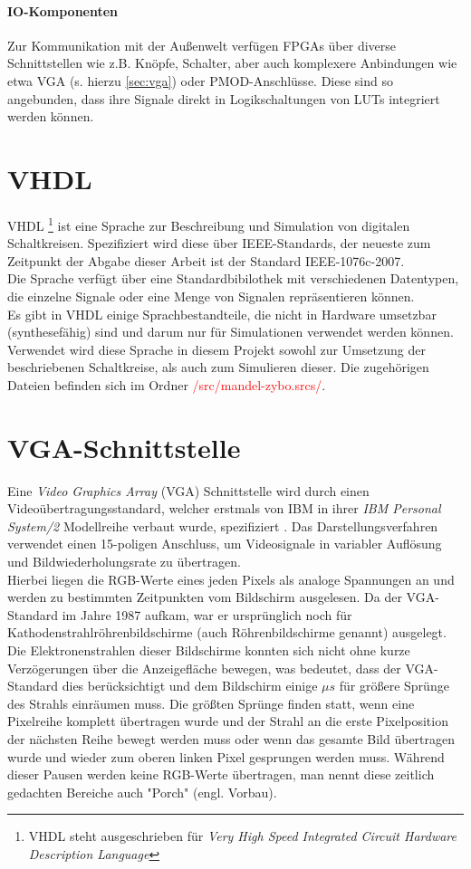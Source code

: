 \documentclass[a4paper,12pt,onesided]{report}
\begin{document}
\paragraph{IO-Komponenten}
Zur Kommunikation mit der Außenwelt verfügen FPGAs über diverse Schnittstellen wie z.B. Knöpfe, Schalter, aber auch komplexere Anbindungen wie etwa VGA (s. hierzu \autoref{sec:vga}) oder PMOD-Anschlüsse.
Diese sind so angebunden, dass ihre Signale direkt in Logikschaltungen von LUTs integriert werden können.

\section{VHDL}
\label{sec:vhdl}
VHDL \footnote{VHDL steht ausgeschrieben für \textit{Very High Speed Integrated Circuit Hardware Description Language}} ist eine Sprache zur Beschreibung und Simulation von digitalen Schaltkreisen.
Spezifiziert wird diese über IEEE-Standards, der neueste zum Zeitpunkt der Abgabe dieser Arbeit ist der Standard IEEE-1076c-2007\cite{ieeevhdl}.\\
Die Sprache verfügt über eine Standardbibilothek mit verschiedenen Datentypen, die einzelne Signale oder eine Menge von Signalen repräsentieren können.\\
Es gibt in VHDL einige Sprachbestandteile, die nicht in Hardware umsetzbar (synthesefähig) sind und darum nur für Simulationen verwendet werden können.
Verwendet wird diese Sprache in diesem Projekt sowohl zur Umsetzung der beschriebenen Schaltkreise, als auch zum Simulieren dieser.
Die zugehörigen Dateien befinden sich im Ordner \textcolor{red}{/src/mandel-zybo.srcs/}.

\section{VGA-Schnittstelle}
\label{sec:vga}
Eine \textit{Video Graphics Array} (VGA) Schnittstelle wird durch einen Videoübertragungsstandard, welcher erstmals von IBM in ihrer \textit{IBM Personal System/2} Modellreihe verbaut wurde, spezifiziert \cite{ibmTimeline}. 
Das Darstellungsverfahren verwendet einen 15-poligen Anschluss, um Videosignale in variabler Auflösung und Bildwiederholungsrate zu übertragen.\\
Hierbei liegen die RGB-Werte eines jeden Pixels als analoge Spannungen an und werden zu bestimmten Zeitpunkten vom Bildschirm ausgelesen. 
Da der VGA-Standard im Jahre 1987 aufkam, war er ursprünglich noch für  Kathodenstrahlröhrenbildschirme (auch Röhrenbildschirme genannt) ausgelegt. 
Die Elektronenstrahlen dieser Bildschirme konnten sich nicht ohne kurze Verzögerungen über die Anzeigefläche bewegen, was bedeutet, dass der VGA-Standard dies berücksichtigt und dem Bildschirm einige $\mu s$ für größere Sprünge des Strahls einräumen muss.
Die größten Sprünge finden statt, wenn eine Pixelreihe komplett übertragen wurde und der Strahl an die erste Pixelposition der nächsten Reihe bewegt werden muss oder wenn das gesamte Bild übertragen wurde und wieder zum oberen linken Pixel gesprungen werden muss.
Während dieser Pausen werden keine RGB-Werte übertragen, man nennt diese zeitlich gedachten Bereiche auch "Porch" (engl. Vorbau).\\
\end{document}
